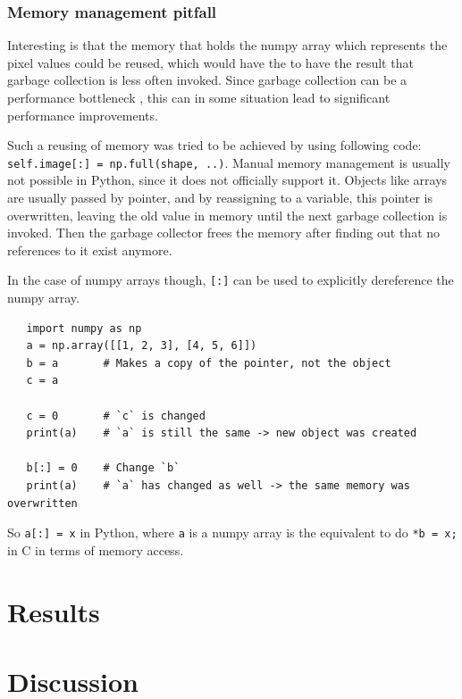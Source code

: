 \documentclass[12pt, a4paper, titlepage]{report}
\begin{document}
\subsection{Memory management pitfall}

Interesting is that the memory that holds the numpy array which represents the pixel values could be reused, which would have the to have the result that garbage collection is less often invoked. Since garbage collection can be a performance bottleneck      %
, this can in some situation lead to significant performance improvements.      %

Such a reusing of memory was tried to be achieved by using following code: \lstinline{self.image[:] = np.full(shape, ..)}. Manual memory management is usually not possible in Python, since it does not officially support it. Objects like arrays are usually passed by pointer, and by reassigning to a variable, this pointer is overwritten, leaving the old value in memory until the next garbage collection is invoked. Then the garbage collector frees the memory after finding out that no references to it exist anymore.      %

In the case of numpy arrays though, \lstinline{[:]} can be used to explicitly dereference the numpy array.

\begin{lstlisting}
   import numpy as np
   a = np.array([[1, 2, 3], [4, 5, 6]])
   b = a       # Makes a copy of the pointer, not the object
   c = a

   c = 0       # `c` is changed
   print(a)    # `a` is still the same -> new object was created

   b[:] = 0    # Change `b`
   print(a)    # `a` has changed as well -> the same memory was overwritten
\end{lstlisting}

So \lstinline{a[:] = x} in Python, where \lstinline{a} is a numpy array is the equivalent to do \lstinline{*b = x;} in C in terms of memory access.




\chapter{Results}


\chapter{Discussion}
\end{document}
